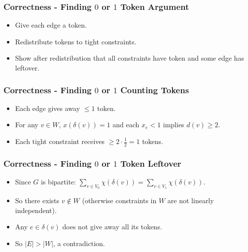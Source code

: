 \documentclass{beamer}
\begin{document}
\begin{frame}
\frametitle{Correctness - Finding $0$ or $1$ Token Argument}
\begin{itemize}
\item Give each edge a token.
\item Redistribute tokens to tight constraints.
\item Show after redistribution that all constraints have token and some edge has leftover.
\end{itemize}
\end{frame}

\begin{frame}
\frametitle{Correctness - Finding $0$ or $1$ Counting Tokens}
\begin{itemize}
\item<1->Each edge gives away $\leq 1$ token.
\item<2-> For any $v \in W$, $x(\delta(v)) = 1$ and each $x_e < 1$ implies $d(v) \geq 2$.
\item<3-> Each tight constraint receives $\geq 2 \cdot \frac{1}{2} = 1$ tokens.
\end{itemize}
\end{frame}

\begin{frame}
\frametitle{Correctness - Finding $0$ or $1$ Token Leftover}
\begin{itemize}
\item<1-> Since $G$ is bipartite: $\sum_{v \in V_0} \chi(\delta(v)) = \sum_{v \in V_1} \chi(\delta(v))$.
\item<2-> So there exists $v \not\in W$ (otherwise constraints in $W$ are not linearly independent).
\item<3-> Any $e \in \delta(v)$ does not give away all its tokens.
\item<4-> So $|E| > |W|$, a contradiction.
\end{itemize}
\end{frame}
\end{document}
